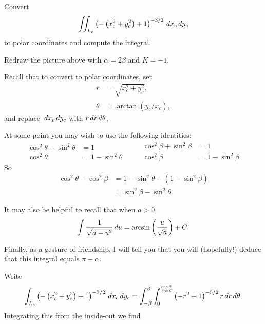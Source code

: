 \documentclass[newpage,hints,handout]{ximera}
\begin{document}
\begin{problem}
  Convert
  \[
  \iint_{L_c} \left(-\left(x_c^2+y_c^2\right)+1\right)^{-3/2} \,d x_c\,d y_c
  \]
  to polar coordinates and compute the integral.
  \begin{hint}
    Redraw the picture above with $\alpha = 2\beta$ and $K=-1$.
  \end{hint}
  \begin{hint}
    Recall that to convert to polar coordinates, set
    \begin{align*}
      r &= \sqrt{x_c^2+y_c^2},\\
      \theta &= \arctan(y_c/x_c),
    \end{align*}
    and replace $\,d x_c\,d y_c$ with $r\,d r\,d \theta$.
  \end{hint}
  \begin{hint}
    At some point you may wish to use the following identities:
    \[
    \begin{split}
      \cos^2\theta + \sin^2\theta &=1\\
      \cos^2\theta &= 1-\sin^2\theta
    \end{split}
    \qquad
    \begin{split}
      \cos^2\beta + \sin^2\beta &=1\\
      \cos^2\beta &= 1-\sin^2\beta
    \end{split}
    \]
    So
    \begin{align*}
      \cos^2\theta - \cos^2\beta &= 1 - \sin^2\theta - \left(1-\sin^2\beta\right)\\
      &= \sin^2\beta - \sin^2\theta.       
    \end{align*}
  \end{hint}
  \begin{hint}
    It may also be helpful to recall that when $a>0$,
    \[
    \int \frac{1}{\sqrt{a - u^2}} \,d u = \arcsin\left(\frac{u}{\sqrt{a}}\right) + C.
    \]
  \end{hint}
  \begin{hint}
    Finally, as a gesture of friendship, I will tell you that you will
    (hopefully!) deduce that this integral equals $\pi-\alpha$.
  \end{hint}
  \begin{freeResponse}
    Write
    \[
    \int_{L_c} \left(-\left(x_c^2+y_c^2\right)+1\right)^{-3/2} \,d x_c\,d y_c
    = \int_{-\beta}^\beta \int_0^{\frac{\cos \beta}{\cos\theta}}\left(-r^2+1\right)^{-3/2} r\,d r\,d \theta.
    \]
    Integrating this from the inside-out we find
    \begin{align*}

\end{align*}
\end{freeResponse}
\end{problem}
\end{document}
